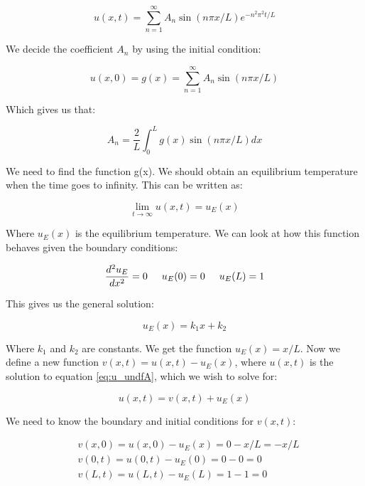 \documentclass{article}
\begin{document}
\begin{equation}
u(x,t) = \sum_{n=1}^{\infty}A_n\sin{(n\pi x/L)}e^{-n^2\pi^2t/L}
\label{eq:u_undfA}
\end{equation}

We decide the coefficient $A_n$ by using the initial condition:

\begin{equation}
u(x,0)=g(x)=\sum_{n=1}^{\infty}A_n\sin{(n\pi x/L)}
\end{equation}

Which gives us that:

\begin{equation*}
A_n=\frac{2}{L}\int_0^Lg(x)\sin{(n\pi x/L)} dx
\end{equation*}

We need to find the function g(x). We should obtain an equilibrium temperature when the time goes to infinity. This can be written as:

\begin{equation*}
\lim_{t \to \infty} u(x,t) = u_E(x)
\end{equation*}

Where $u_E(x)$ is the equilibrium temperature. We can look at how this function behaves given the boundary conditions:

\begin{equation*}
\frac{d^2 u_E}{dx^2}=0 \hspace{0.5cm} u_E(0)=0\hspace{0.5cm} u_E(L)=1
\end{equation*}

This gives us the general solution:

\begin{equation*}
u_E(x)=k_1x + k_2
\end{equation*}

Where $k_1$ and $k_2$ are constants. We get the function $u_E(x)=x/L$. Now we define a new function $v(x,t)=u(x,t)-u_E(x)$, where $u(x,t)$ is the solution to equation \ref{eq:u_undfA}, which we wish to solve for:

\begin{equation}
u(x,t)=v(x,t)+u_E(x)
\label{eq:vu}
\end{equation}

We need to know the boundary and initial conditions for $v(x,t)$:

\begin{equation*}
\begin{split}
&v(x,0)=u(x,0)-u_E(x)=0-x/L=-x/L\\
&v(0,t)=u(0,t)-u_E(0)=0-0=0\\
&v(L,t)=u(L,t)-u_E(L)=1-1=0
\end{split}
\end{equation*}
 
\end{document}
